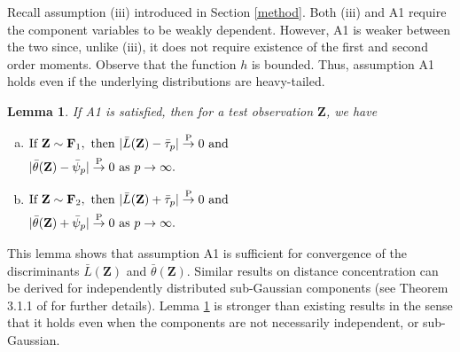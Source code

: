 \documentclass[twoside]{article}
\newcommand{\bZ}{\mathbf{Z}}
\newcommand{\bF}{\mathbf{F}}
\newcommand{\0}{\mathbf{0}}
\newcommand{\1}{\mathbf{1}}
\numberwithin{equation}{section}
\newtheorem{lemma}[thm]{Lemma}
\begin{document}
Recall assumption (iii) introduced in Section \ref{method}. Both (iii) and A1 require the component variables to be weakly dependent. However, A1 is weaker between the two since, unlike (iii), it does not require existence of the first and second order moments. Observe that the function $h$ is bounded. Thus, assumption A1 holds even if the underlying distributions are heavy-tailed.

\begin{lemma}\label{L2}
 If {\rm A1} is satisfied, then for a test observation $\bZ$, we have
\begin{enumerate}[(a)]
\item  $\begin{aligned}[t]&\text{If }\bZ\sim\bF_1,\text{ then }
|\bar{L}(\bZ) - \bar{\tau}_p|\stackrel{\rm P}{\to}0\text{ and}\\
&|\bar{\theta}(\bZ)-\bar{\psi}_p|\stackrel{\rm P}{\to}0\text{ as } p\to\infty .
 \end{aligned}$
\item  $\begin{aligned}[t]&\text{If }\bZ\sim\bF_2,\text{ then }
 |\bar{L}(\bZ) + \bar{\tau}_p|\stackrel{\rm P}{\to}0\text{ and}\\
    &|\bar{\theta}(\bZ)+\bar{\psi}_p|\stackrel{\rm P}{\to}0\text{ as } p\to\infty.
 \end{aligned}$
\end{enumerate}
\end{lemma}
This lemma shows that assumption A1 is sufficient for convergence of the discriminants $\bar{L}(\bZ)$ and $\bar{\theta}(\bZ)$. Similar results on distance concentration can be derived for independently distributed sub-Gaussian components (see Theorem 3.1.1 of \cite{vershynin2018high} for further details). Lemma \ref{L2} is stronger than existing results in the sense that it holds even when the components are not necessarily independent, or sub-Gaussian.
\end{document}
